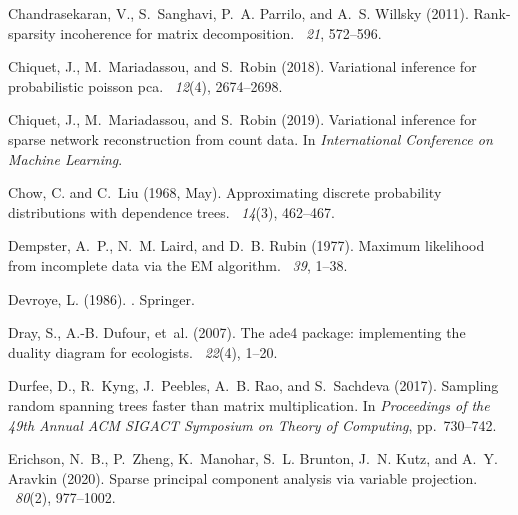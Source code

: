 \documentclass{article}                     %
\begin{document}
\begin{thebibliography}{}
Chandrasekaran, V., S.~Sanghavi, P.~A. Parrilo, and A.~S. Willsky (2011).
\newblock Rank-sparsity incoherence for matrix decomposition.
~{\em 21}, 572--596.

Chiquet, J., M.~Mariadassou, and S.~Robin (2018).
\newblock Variational inference for probabilistic poisson pca.
~{\em 12\/}(4), 2674--2698.

Chiquet, J., M.~Mariadassou, and S.~Robin (2019).
\newblock Variational inference for sparse network reconstruction from count
  data.
\newblock In {\em International Conference on Machine Learning}.

Chow, C. and C.~Liu (1968, May).
\newblock Approximating discrete probability distributions with dependence
  trees.
~{\em 14\/}(3),
  462--467.

Dempster, A.~P., N.~M. Laird, and D.~B. Rubin (1977).
\newblock Maximum likelihood from incomplete data via the {EM} algorithm.
~{\em 39}, 1--38.

Devroye, L. (1986).
.
\newblock Springer.

Dray, S., A.-B. Dufour, et~al. (2007).
\newblock The ade4 package: implementing the duality diagram for ecologists.
~{\em 22\/}(4), 1--20.

Durfee, D., R.~Kyng, J.~Peebles, A.~B. Rao, and S.~Sachdeva (2017).
\newblock Sampling random spanning trees faster than matrix multiplication.
\newblock In {\em Proceedings of the 49th Annual ACM SIGACT Symposium on Theory
  of Computing}, pp.\  730--742.

Erichson, N.~B., P.~Zheng, K.~Manohar, S.~L. Brunton, J.~N. Kutz, and A.~Y.
  Aravkin (2020).
\newblock Sparse principal component analysis via variable projection.
~{\em 80\/}(2), 977--1002.


\end{thebibliography}
\end{document}
